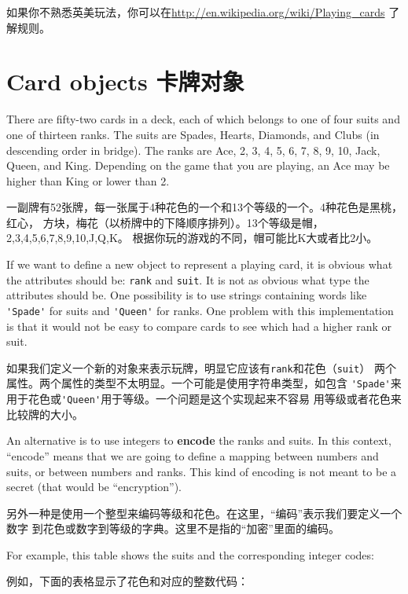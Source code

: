 \documentclass[10pt]{book}
\begin{document}
\begin{CJK}{UTF8}{gbsn}
如果你不熟悉英美玩法，你可以在\url{http://en.wikipedia.org/wiki/Playing_cards}
了解规则。


\section{Card objects 卡牌对象}

There are fifty-two cards in a deck, each of which belongs to one of
four suits and one of thirteen ranks.  The suits are Spades, Hearts,
Diamonds, and Clubs (in descending order in bridge).  The ranks are
Ace, 2, 3, 4, 5, 6, 7, 8, 9, 10, Jack, Queen, and King.  Depending on
the game that you are playing, an Ace may be higher than King
or lower than 2.

一副牌有52张牌，每一张属于4种花色的一个和13个等级的一个。4种花色是黑桃，红心，
方块，梅花（以桥牌中的下降顺序排列）。13个等级是帽，2,3,4,5,6,7,8,9,10,J,Q,K。
根据你玩的游戏的不同，帽可能比K大或者比2小。

If we want to define a new object to represent a playing card, it is
obvious what the attributes should be: {\tt rank} and
{\tt suit}.  It is not as obvious what type the attributes
should be.  One possibility is to use strings containing words like
\verb"'Spade'" for suits and \verb"'Queen'" for ranks.  One problem with
this implementation is that it would not be easy to compare cards to
see which had a higher rank or suit.

如果我们定义一个新的对象来表示玩牌，明显它应该有{\tt rank}和花色（{\tt suit}）
两个属性。两个属性的类型不太明显。一个可能是使用字符串类型，如包含
\verb"'Spade'"来用于花色或\verb"'Queen'"用于等级。一个问题是这个实现起来不容易
用等级或者花色来比较牌的大小。

An alternative is to use integers to {\bf encode} the ranks and suits.
In this context, ``encode'' means that we are going to define a mapping
between numbers and suits, or between numbers and ranks.  This
kind of encoding is not meant to be a secret (that
would be ``encryption'').

另外一种是使用一个整型来编码等级和花色。在这里，``编码''表示我们要定义一个数字
到花色或数字到等级的字典。这里不是指的``加密''里面的编码。

\newcommand{\mymapsto}{$\mapsto$}

For example, this table shows the suits and the corresponding integer
codes:

例如，下面的表格显示了花色和对应的整数代码：


\end{CJK}
\end{document}
